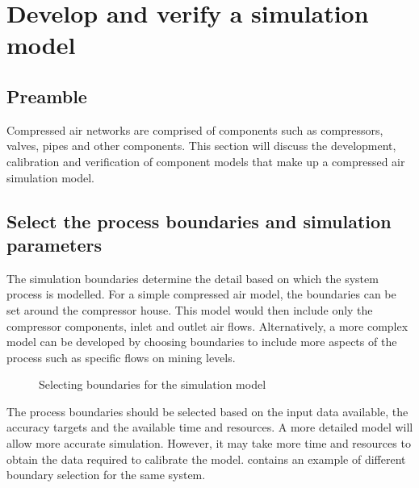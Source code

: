 \section{Develop and verify a simulation model}
	\subsection{Preamble}
	Compressed air networks are comprised of components such as compressors, valves, pipes and other components. This section will discuss the development, calibration and verification of component models that make up a compressed air simulation model. 
	
	\subsection{Select the process boundaries and simulation parameters}
	The simulation boundaries determine the detail based on which the system process is modelled. For a simple compressed air model, the boundaries can be set around the compressor house. This model would then include only the compressor components, inlet and outlet air flows. Alternatively, a more complex model can be developed by choosing boundaries to include more aspects of the process such as specific flows on mining levels.\par 
	 \begin{figure}[h]
	 	\centering
	 	\caption{Selecting boundaries for the simulation model}
	 	\label{fig: Sensitivity}
	 \end{figure}
	The process boundaries should be selected based on the input data available, the accuracy targets and the available time and resources. A more detailed model will allow more accurate simulation. However, it may take more time and resources to obtain the data required to calibrate the model.  contains an example of different boundary selection for the same system.
